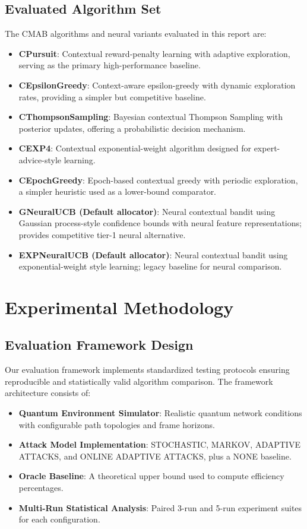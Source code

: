 \documentclass[12pt,a4paper]{article}
\begin{document}
\subsection{Evaluated Algorithm Set}

The CMAB algorithms and neural variants evaluated in this report are:

\begin{itemize}
\item \textbf{CPursuit}: Contextual reward-penalty learning with adaptive exploration, serving as the primary high-performance baseline.
\item \textbf{CEpsilonGreedy}: Context-aware epsilon-greedy with dynamic exploration rates, providing a simpler but competitive baseline.
\item \textbf{CThompsonSampling}: Bayesian contextual Thompson Sampling with posterior updates, offering a probabilistic decision mechanism.
\item \textbf{CEXP4}: Contextual exponential-weight algorithm designed for expert-advice-style learning.
\item \textbf{CEpochGreedy}: Epoch-based contextual greedy with periodic exploration, a simpler heuristic used as a lower-bound comparator.
\item \textbf{GNeuralUCB (Default allocator)}: Neural contextual bandit using Gaussian process-style confidence bounds with neural feature representations; provides competitive tier-1 neural alternative.
\item \textbf{EXPNeuralUCB (Default allocator)}: Neural contextual bandit using exponential-weight style learning; legacy baseline for neural comparison.
\end{itemize}

\section{Experimental Methodology}

\subsection{Evaluation Framework Design}

Our evaluation framework implements standardized testing protocols ensuring reproducible and statistically valid algorithm comparison. The framework architecture consists of:

\begin{itemize}
\item \textbf{Quantum Environment Simulator}: Realistic quantum network conditions with configurable path topologies and frame horizons.
\item \textbf{Attack Model Implementation}: STOCHASTIC, MARKOV, ADAPTIVE ATTACKS, and ONLINE ADAPTIVE ATTACKS, plus a NONE baseline.
\item \textbf{Oracle Baseline}: A theoretical upper bound used to compute efficiency percentages.
\item \textbf{Multi-Run Statistical Analysis}: Paired 3-run and 5-run experiment suites for each configuration.
\end{itemize}
\end{document}
